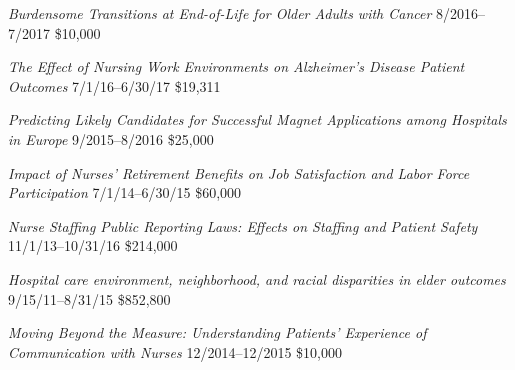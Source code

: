 \documentclass[10pt,]{article}
\begin{document}
{{{{{{{{{{{{{{\textit {Burdensome Transitions at End-of-Life for Older Adults with Cancer} \hfill 8/2016--7/2017 \newline
{}	\hfill \$10,000

\textit {The Effect of Nursing Work Environments on Alzheimer’s Disease Patient Outcomes} \hfill 7/1/16--6/30/17 \newline
{}	\hfill \$19,311

\textit {Predicting Likely Candidates for Successful Magnet Applications among Hospitals in Europe} \hfill  9/2015--8/2016 \newline
{} \hfill \$25,000

\textit {Impact of Nurses’ Retirement Benefits on Job Satisfaction and Labor Force Participation} \hfill 7/1/14--6/30/15 \newline
{}\hfill \$60,000

\textit {Nurse Staffing Public Reporting Laws: Effects on Staffing and Patient Safety} \hfill 11/1/13--10/31/16 \newline
{}	\hfill \$214,000

\textit {Hospital care environment, neighborhood, and racial disparities in elder outcomes} \hfill 9/15/11--8/31/15 \newline
{}	\hfill \$852,800

\textit {Moving Beyond the Measure: Understanding Patients' Experience of Communication with Nurses} \hfill 12/2014--12/2015 \newline
{}	\hfill \$10,000

}}}}}}}}}}}}}}
\end{document}
